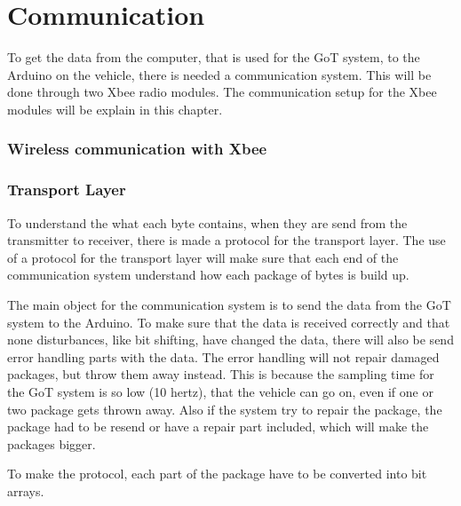 \chapter{Communication}
To get the data from the computer, that is used for the GoT system, to the Arduino on the vehicle, there is needed a communication system. This will be done through two Xbee radio modules. The communication setup for the Xbee modules will be explain in this chapter.

\subsection{Wireless communication with Xbee}




\subsection{Transport Layer}
To understand the what each byte contains, when they are send from the transmitter to receiver, there is made a protocol for the transport layer. The use of a protocol for the transport layer will make sure that each end of the communication system understand how each package of bytes is build up.

The main object for the communication system is to send the data from the GoT system to the Arduino. To make sure that the data is received correctly and that none disturbances, like bit shifting, have changed the data, there will also be send error handling parts with the data. The error handling will not repair damaged packages, but throw them away instead. This is because the sampling time for the GoT system is so low (10 hertz), that the vehicle can go on, even if one or two package gets thrown away. Also if the system try to repair the package, the package had to be resend or have a repair part included, which will make the packages bigger.

To make the protocol, each part of the package have to be converted into bit arrays.

